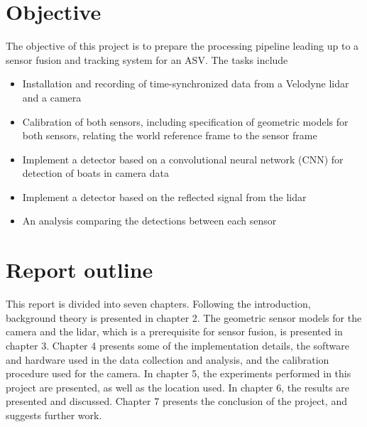 \section{Objective}
The objective of this project is to prepare the processing pipeline leading up to a sensor fusion and tracking system for an ASV. The tasks include 
\begin{itemize}
	\item Installation and recording of time-synchronized data from a Velodyne lidar and a camera
	\item Calibration of both sensors, including specification of geometric models for both sensors, relating the world reference frame to the sensor frame
	\item Implement a detector based on a convolutional neural network (CNN) for detection of boats in camera data
	\item Implement a detector based on the reflected signal from the lidar
	\item An analysis comparing the detections between each sensor
\end{itemize}
\section{Report outline}
This report is divided into seven chapters. Following the introduction, background theory is presented in chapter 2. The geometric sensor models for the camera and the lidar, which is a prerequisite for sensor fusion, is presented in chapter 3. Chapter 4 presents some of the implementation details, the software and hardware used in the data collection and analysis, and the calibration procedure used for the camera. In chapter 5, the experiments performed in this project are presented, as well as the location used. In chapter 6, the results are presented and discussed. Chapter 7 presents the conclusion of the project, and suggests further work.

\cleardoublepage